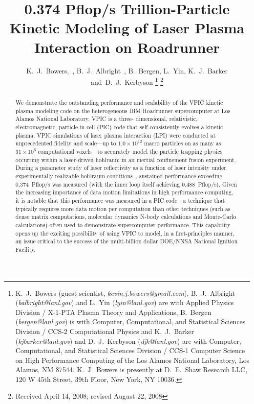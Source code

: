 \documentclass[journal,twoside]{IEEEtran}
\begin{document}
\title{0.374 Pflop/s Trillion-Particle Kinetic Modeling of Laser Plasma
Interaction on Roadrunner}

\author{K.~J.~Bowers,~,
        B.~J.~Albright~,
        B.~Bergen,
        L.~Yin,
        K.~J.~Barker
        and~D.~J.~Kerbyson%
\thanks{
K.~J.~Bowers (guest scientist, \emph{kevin.j.bowers@gmail.com}),
B.~J.~Albright (\emph{balbright@lanl.gov}) and L.~Yin
(\emph{lyin@lanl.gov}) are with Applied Physics Division / X-1-PTA
Plasma Theory and Applications, B.~Bergen (\emph{bergen@lanl.gov}) is
with Computer, Computational, and Statistical Sciences Division /
CCS-2 Computational Physics and K.~J.~Barker
(\emph{kjbarker@lanl.gov}) and D.~J.~Kerbyson (\emph{djk@lanl.gov})
are with Computer, Computational, and Statistical Sciences Division /
CCS-1 Computer Science on High Performance Computing of the Los Alamos
National Laboratory, Los Alamos, NM 87544.  K.~J.~Bowers is presently
at D.~E.~Shaw Research LLC, 120 W 45th Street, 39th Floor, New York,
NY 10036.}%
\thanks{Received April 14, 2008; revised August 22, 2008}
}


\maketitle

\begin{abstract}
We demonstrate the outstanding performance and scalability of the VPIC
kinetic plasma modeling code on the heterogeneous IBM Roadrunner
supercomputer at Los Alamos National Laboratory.  VPIC is a three-
dimensional, relativistic, electromagnetic, particle-in-cell (PIC)
code that self-consistently evolves a kinetic plasma.  VPIC
simulations of laser plasma interaction (LPI) were conducted at
unprecedented fidelity and scale---up to $1.0 \times 10^{12}$ macro
particles on as many as $31
\times 10^6$ computational voxels---to accurately model the particle
trapping physics occurring within a laser-driven hohlraum in an
inertial confinement fusion experiment.  During a parameter study of
laser reflectivity as a function of laser intensity under
experimentally realizable hohlraum
conditions~\cite{AAC_Conference_Paper}, sustained performance
exceeding 0.374~Pflop/s was measured (with the inner loop itself
achieving 0.488~Pflop/s).  Given the increasing importance of
data motion limitations in high performance computing, it is notable
that this performance was measured in a PIC code---a technique that
typically requires more data motion per computation than other
techniques (such as dense matrix computations, molecular dynamics
N-body calculations and Monte-Carlo calculations) often used to
demonstrate supercomputer performance.  This capability opens up the
exciting possibility of using VPIC to model, in a first-principles
manner, an issue critical to the success of the multi-billion dollar
DOE/NNSA National Ignition Facility.
\end{abstract}
\end{document}
